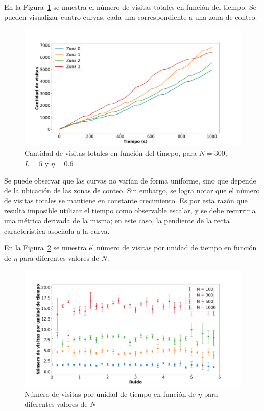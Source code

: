 \documentclass[11pt, a4paper]{article}
\begin{document}
            En la Figura~\ref{fig:visitas_obc_2} se muestra el número de visitas totales en función del tiempo.
            Se pueden visualizar cuatro curvas, cada una correspondiente a una zona de conteo.

            \begin{figure}[H]
                \centering
                \includegraphics[width=\textwidth]{./visits_vs_time_obc-n300-eta0p6}
                \caption{Cantidad de visitas totales en función del timepo, para $N = 300$, $L = 5$ y $\eta = 0.6$}
                \label{fig:visitas_obc_2}
            \end{figure}

            Se puede observar que las curvas no varían de forma uniforme, sino que depende de la ubicación de las zonas de conteo.
            Sin embargo, se logra notar que el número de visitas totales se mantiene en constante crecimiento.
            Es por esta razón que resulta imposible utilizar el tiempo como observable escalar, y se debe recurrir a una
            métrica derivada de la misma; en este caso, la pendiente de la recta característica asociada a la curva.

            En la Figura~\ref{fig:visitas_obc_3} se muestra el número de visitas por unidad de tiempo en función de
            $\eta$ para diferentes valores de $N$.

            \begin{figure}[H]
                \centering
                \includegraphics[width=\textwidth]{./slope_vs_eta-obc}
                \caption{Número de visitas por unidad de tiempo en función de $\eta$ para diferentes valores de $N$}
                \label{fig:visitas_obc_3}
            \end{figure}
\end{document}
